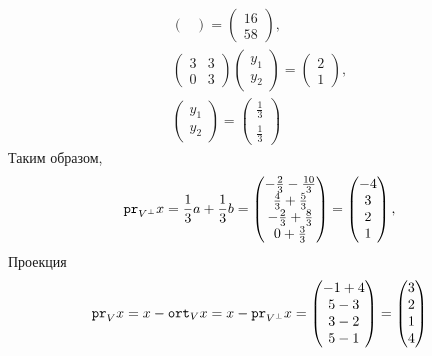 \documentclass[12pt]{article}
\begin{document}
\begin{gather*}
\begin{pmatrix}
        \end{pmatrix}
        =
        \begin{pmatrix}
            16 \\
            58
        \end{pmatrix}, \\
        \begin{pmatrix}
            3 & 3 \\
            0 & 3
        \end{pmatrix}
        \begin{pmatrix}
            y_1 \\
            y_2
        \end{pmatrix}
        =
        \begin{pmatrix}
            2 \\
            1
        \end{pmatrix}, \\
        \begin{pmatrix}
            y_1 \\
            y_2
        \end{pmatrix}
        =
        \begin{pmatrix}
            \frac{1}{3} \\
            \frac{1}{3}
        \end{pmatrix}
    \end{gather*}
    Таким образом,
    \[
        \texttt{pr}_{V^\perp} {x}
        = \frac{1}{3} a + \frac{1}{3} b
        =
        \begin{pmatrix}
            - \frac{2}{3} - \frac{10}{3} \\
            \frac{4}{3} + \frac{5}{3}    \\
            - \frac{2}{3} + \frac{8}{3}  \\
            0 + \frac{3}{3}
        \end{pmatrix}
        =
        \begin{pmatrix}
            -4 \\
            3  \\
            2  \\
            1
        \end{pmatrix},
    \]
    Проекция
    \[
        \texttt{pr}_{V} {x}
        = x - \texttt{ort}_{V} {x}
        = x - \texttt{pr}_{V^\perp} {x}
        =
        \begin{pmatrix}
            -1 + 4 \\
            5 - 3  \\
            3 - 2  \\
            5 - 1
        \end{pmatrix}
        =
        \begin{pmatrix}
            3 \\
            2 \\
            1 \\
            4
        \end{pmatrix}
    \]
\end{document}
